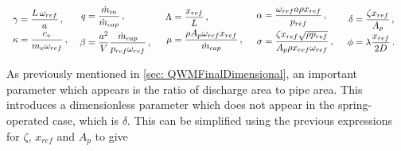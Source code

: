 ~
\begin{equation*}
    \begin{tabular}{p{2.1cm} p{2.8cm} p{3cm} p{3cm} p{2cm}}
        $ \begin{aligned}
            \gamma &= \frac{L \, \omega_{ref}}{a}  \, , \\
            \kappa &= \frac{c_v}{m_v \omega_{ref}} \, ,
        \end{aligned} $
        &
        $ \begin{aligned}
            q &= \frac{\dot{m}_{in}}{\dot{m}_{cap}} \, , \\
            \beta &= \frac{a^2}{V} \frac{\dot{m}_{cap}}{p_{ref} \omega_{ref}} \, ,
        \end{aligned} $
        &
        $ \begin{aligned}
            \Lambda &= \frac{x_{ref}}{L} \, , \\
            \mu &= \frac{\rho A_p \omega_{ref} x_{ref}}{\dot{m}_{cap}} \, ,
        \end{aligned} $
        &
        $ \begin{aligned}
            \alpha &= \frac{\omega_{ref} a \rho x_{ref}}{p_{ref}} \, , \\
            \sigma &= \frac{\zeta x_{ref} \sqrt{\rho p_{ref}}}{A_p \rho x_{ref} \omega_{ref}} \, ,
        \end{aligned} $
        &
        $ \begin{aligned}
            \delta &= \frac{\zeta x_{ref}}{A_p} \, , \\
            \phi &= \lambda \frac{x_{ref}}{2D} \, .
        \end{aligned} $
    \end{tabular}
\end{equation*}

As previously mentioned in \cref{sec: QWMFinalDimensional}, an important parameter which appears is the ratio of discharge area to pipe area. This introduces a dimensionless parameter which does not appear in the spring-operated case, which is $\delta$. This can be simplified using the previous expressions for $\zeta$, $x_{ref}$ and $A_p$ to give

